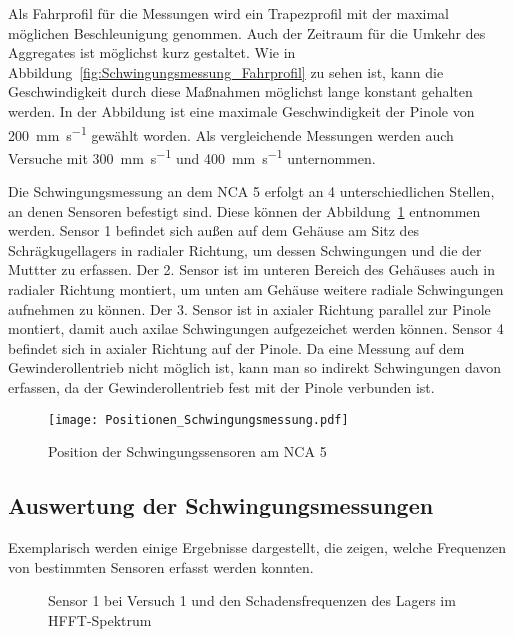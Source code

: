 Als Fahrprofil für die Messungen wird ein Trapezprofil mit der maximal möglichen Beschleunigung genommen. Auch der Zeitraum für die Umkehr des Aggregates ist möglichst kurz gestaltet. Wie in Abbildung~\ref{fig:Schwingungsmessung_Fahrprofil} zu sehen ist, kann die Geschwindigkeit durch diese Maßnahmen möglichst lange konstant gehalten werden. In der Abbildung ist eine maximale Geschwindigkeit der Pinole von \SI{200}{\milli\meter\per\second} gewählt worden. Als vergleichende Messungen werden auch Versuche mit \SI{300}{\milli\meter\per\second} und \SI{400}{\milli\meter\per\second} unternommen.



Die Schwingungsmessung an dem NCA 5 erfolgt an 4 unterschiedlichen Stellen, an denen Sensoren befestigt sind. Diese können der Abbildung~\ref{fig:Position_der_Schwingungssensoren_am_NCA} entnommen werden. Sensor 1 befindet sich außen auf dem Gehäuse am Sitz des Schrägkugellagers  in radialer Richtung, um dessen Schwingungen und die der Muttter zu erfassen. Der 2. Sensor ist im unteren Bereich des Gehäuses auch in radialer Richtung montiert, um unten am Gehäuse weitere radiale Schwingungen aufnehmen zu können. Der 3. Sensor ist in axialer Richtung parallel zur Pinole montiert, damit auch axilae Schwingungen aufgezeichet werden können.  Sensor 4 befindet sich in axialer Richtung auf der Pinole. Da eine Messung auf dem Gewinderollentrieb nicht möglich ist, kann man so indirekt Schwingungen davon erfassen, da der Gewinderollentrieb fest mit der Pinole verbunden ist.



\begin{figure}[H]
\centering
 \texttt{[image: Positionen\_Schwingungsmessung.pdf]}
\caption{Position der Schwingungssensoren am NCA 5}
\label{fig:Position_der_Schwingungssensoren_am_NCA}
\end{figure}

\subsection{Auswertung der Schwingungsmessungen}

Exemplarisch werden einige Ergebnisse dargestellt, die zeigen, welche Frequenzen von bestimmten Sensoren erfasst werden konnten.




\begin{figure}[H]
\centering

\caption{Sensor 1 bei Versuch 1 und den Schadensfrequenzen des Lagers im HFFT-Spektrum}
\label{fig:Sensor_1_bei_Versuch_1_und_den_Frequenzen_des_Lagers_im_HFFT_Spektrum}
\end{figure}

